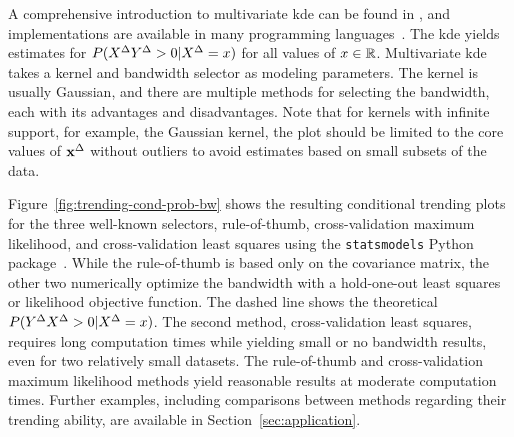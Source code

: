 A comprehensive introduction to multivariate \ac{kde} can be found in \textcite{Gramacki2018}, and implementations are available in many programming languages~\parencite[e.g., for  Python in][]{Seabold2010}.
The \ac{kde} yields estimates for $P(X^{\Delta} Y^{\Delta} > 0 | X^{\Delta} = x)$ for all values of $x \in \mathbb{R}$.
Multivariate \ac{kde} takes a kernel and bandwidth selector as modeling parameters. 
The kernel is usually Gaussian, and there are multiple methods for selecting the bandwidth, each with its advantages and disadvantages.
Note that for kernels with infinite support, for example, the Gaussian kernel, the plot should be limited to the core values of $\mathbf{x}^{\Delta}$ without outliers to avoid estimates based on small subsets of the data.

Figure~\ref{fig:trending-cond-prob-bw} shows the resulting conditional trending plots for the three well-known selectors, rule-of-thumb, cross-validation maximum likelihood, and cross-validation least squares using the \verb|statsmodels| Python package~\parencite{Seabold2010}.
While the rule-of-thumb is based only on the covariance matrix, the other two numerically optimize the bandwidth with a hold-one-out least squares or likelihood objective function.
The dashed line shows the theoretical $P(Y^{\Delta} X^{\Delta} > 0 | X^{\Delta} = x)$.
The second method, cross-validation least squares, requires long computation times while yielding small or no bandwidth results, even for two relatively small datasets.
The rule-of-thumb and cross-validation maximum likelihood methods yield reasonable results at moderate computation times. 
Further examples, including comparisons between methods regarding their trending ability, are available in Section~\ref{sec:application}.

